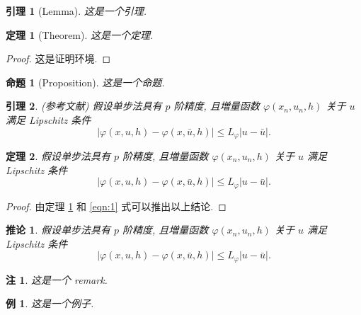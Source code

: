\documentclass[a4paper,12pt]{article}
\theoremstyle{plain}
\newtheorem{proposition}{命题}[section]
\newtheorem{lemma}{引理}[section]
\newtheorem{theorem}{定理}[section]
\newtheorem{example}{例}[section]
\newtheorem{corollary}{推论}[section]
\newtheorem{remark}{注}[section]
\begin{document}
\begin{lemma}[Lemma] \label{lemma1}
这是一个引理.
\end{lemma}

\begin{theorem}[Theorem]
这是一个定理.
\end{theorem}
\begin{proof}
这是证明环境.
\end{proof}

\begin{proposition}[Proposition]
这是一个命题.
\end{proposition}

\begin{lemma}\label{lemma-convergence} {\rm (\textit{参考文献}\cite{LiLiu1997})}
假设单步法具有 $p$ 阶精度, 且増量函数 $\varphi(x_{n}, u_{n}, h)$ 关于 $u$ 满足 {\rm Lipschitz} 条件
\begin{equation}\label{eqn:3}
|\varphi(x, u, h)-\varphi(x, \bar{u}, h)| \leqslant L_{\varphi}|u-\bar{u}|.
\end{equation}
\end{lemma}

\begin{theorem}\label{theorem-convergence}
假设单步法具有 $p$ 阶精度, 且増量函数 $\varphi(x_{n}, u_{n}, h)$ 关于 $u$ 满足 {\rm Lipschitz} 条件
\begin{equation}\label{eqn:4}
|\varphi(x, u, h)-\varphi(x, \bar{u}, h)| \leqslant L_{\varphi}|u-\bar{u}|.
\end{equation}
\end{theorem}
\begin{proof}
由定理 \ref{lemma1} 和 \eqref{eqn:1} 式可以推出以上结论.
\end{proof}

\begin{corollary}\label{col-convergence}
假设单步法具有 $p$ 阶精度, 且増量函数 $\varphi(x_{n}, u_{n}, h)$ 关于 $u$ 满足 {\rm Lipschitz} 条件
\begin{equation}\label{eqn:5}
|\varphi(x, u, h)-\varphi(x, \bar{u}, h)| \leqslant L_{\varphi}|u-\bar{u}|.
\end{equation}
\end{corollary}


\begin{remark}\label{remark1}
这是一个 remark.
\end{remark}

\begin{example}
这是一个例子.
\end{example}
\end{document}
